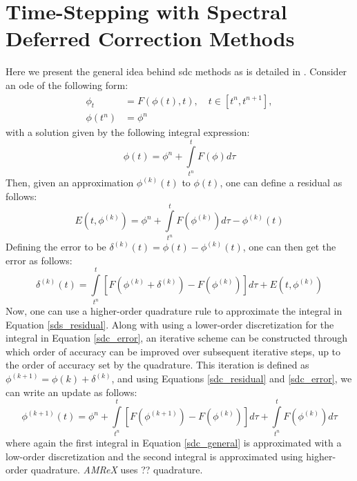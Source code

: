 \section{Time-Stepping with Spectral Deferred Correction Methods}
Here we present the general idea behind \gls{sdc} methods as is detailed in \cite{}. Consider an \gls{ode} of the following form: 
\begin{equation} \label{toy_ode}
\begin{split}
\phi_t &= F(\phi(t), t), \quad t \in [t^n, t^{n+1}], \\
\phi(t^n) &= \phi^n 
\end{split}
\end{equation}
with a solution given by the following integral expression:
\begin{equation}
\phi(t) = \phi^n + \int\limits_{t^n}^{t} F(\phi) d\tau
\end{equation}
Then, given an approximation $\phi^{(k)}(t)$ to $\phi(t)$, one can define a residual as follows:
\begin{equation} \label{sdc_residual}
E(t, \phi^{(k)}) = \phi^n + \int\limits_{t^n}^t  F(\phi^{(k)}) d\tau - \phi^{(k)}(t)
\end{equation}
Defining the error to be $\delta^{(k)}(t) = \phi(t) - \phi^{(k)}(t)$, one can then get the error as follows:
\begin{equation} \label{sdc_error}
\delta^{(k)}(t) = \int\limits_{t^n}^{t} \left[ F(\phi^{(k)} + \delta^{(k)}) - F(\phi^{(k)}) \right] d\tau + E(t, \phi^{(k)})
\end{equation}
Now, one can use a higher-order quadrature rule to approximate the integral in Equation \ref{sds_residual}. Along with using a lower-order discretization for the integral in Equation \ref{sdc_error}, an iterative scheme can be constructed through which order of accuracy can be improved over subsequent iterative steps, up to the order of accuracy set by the quadrature. This iteration is defined as $\phi^{(k+1)} = \phi{(k)} + \delta^{(k)}$, and using Equations \ref{sdc_residual} and \ref{sdc_error}, we can write an update as follows:
\begin{equation} \label{sdc_general}
\phi^{(k+1)}(t) = \phi^n + \int\limits_{t^n}^{t} \left[ F(\phi^{(k+1)}) - F(\phi^{(k)}) \right] d\tau + \int\limits_{t^n}^{t}F(\phi^{(k)}) d\tau
\end{equation}
where again the first integral in Equation \ref{sdc_general} is approximated with a low-order discretization and the second integral is approximated using higher-order quadrature. \textit{AMReX} uses ?? quadrature. 

